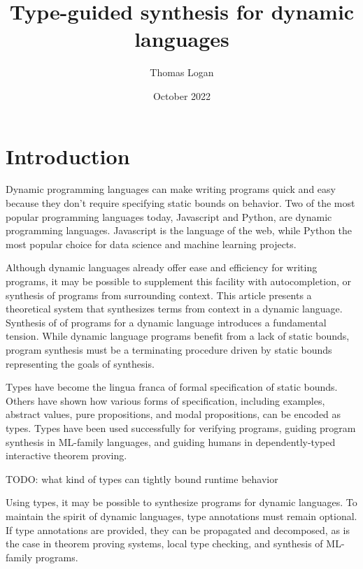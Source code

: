 \documentclass[]{acmart}
\title{Type-guided synthesis for dynamic languages}
\author{Thomas Logan}
\date{October 2022}
\begin{document}
\maketitle

\section{Introduction}
Dynamic programming languages can make writing programs quick and easy 
because they don't require specifying static bounds on behavior.
Two of the most popular programming languages today, Javascript and Python,  are 
dynamic programming languages. 
Javascript is the language of the web, while Python the most popular choice
for data science and machine learning projects. 

Although dynamic languages already offer ease and efficiency for writing programs, it
may be possible to supplement this facility with autocompletion,
or synthesis of programs from surrounding context. 
This article presents a theoretical system that synthesizes terms from context 
in a dynamic language.
Synthesis of of programs for a dynamic language introduces a fundamental tension. 
While dynamic language programs benefit from a lack of static bounds, program synthesis
must be a terminating procedure driven by static bounds representing the goals of synthesis.   

Types have become the lingua franca of formal specification of static bounds.
Others have shown how various forms of specification, including examples, abstract values, 
pure propositions, and modal propositions, can be encoded as types.
Types have been used successfully for verifying programs, 
guiding program synthesis in ML-family languages, 
and guiding humans in dependently-typed interactive theorem proving. 


TODO: what kind of types can tightly bound runtime behavior 


Using types, it may be possible to synthesize programs for dynamic languages.
To maintain the spirit of dynamic languages, type annotations must remain optional.
If type annotations are provided, they can be propagated and decomposed, 
as is the case in theorem proving systems, local type checking, and synthesis of ML-family programs.
\end{document}
